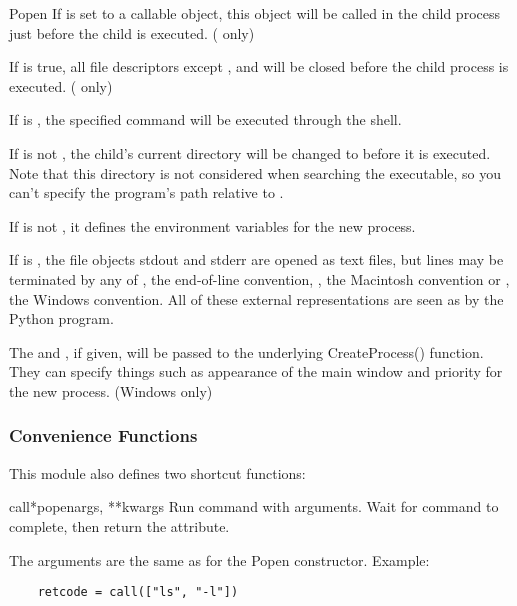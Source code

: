 \begin{classdesc}{Popen}
If  is set to a callable object, this object will be
called in the child process just before the child is executed.
(\UNIX{} only)

If  is true, all file descriptors except ,
 and  will be closed before the child process is
executed. (\UNIX{} only)

If  is , the specified command will be
executed through the shell.

If  is not , the child's current directory will be
changed to  before it is executed.  Note that this directory
is not considered when searching the executable, so you can't specify
the program's path relative to .

If  is not , it defines the environment variables
for the new process.

If  is , the file objects stdout
and stderr are opened as text files, but lines may be terminated by
any of , the \UNIX{} end-of-line convention, ,
the Macintosh convention or , the Windows convention.
All of these external representations are seen as  by the
Python program.  

The  and , if given, will be
passed to the underlying CreateProcess() function.  They can specify
things such as appearance of the main window and priority for the new
process.  (Windows only)
\end{classdesc}

\subsubsection{Convenience Functions}

This module also defines two shortcut functions:

\begin{funcdesc}{call}{*popenargs, **kwargs}
Run command with arguments.  Wait for command to complete, then
return the  attribute.

The arguments are the same as for the Popen constructor.  Example:

\begin{verbatim}
    retcode = call(["ls", "-l"])
\end{verbatim}
\end{funcdesc}

